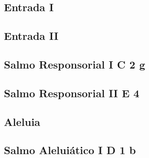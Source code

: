 \def\Prefix{communia/commune-martyrum}

\subsection{Entrada I}\label{subsection:communia/commune-martyrum/introitus-1}

\AllowPageFlush

\subsection{Entrada II}\label{subsection:communia/commune-martyrum/introitus-2}

\AllowPageFlush

\subsection[Salmo Responsorial I]{Salmo Responsorial I \textmd{C 2 g}}\label{subsection:communia/commune-martyrum/psalmus-responsorius-1}

\subsection[Salmo Responsorial II]{Salmo Responsorial II \textmd{E 4}}\label{subsection:communia/commune-martyrum/psalmus-responsorius-2}

\AllowPageFlush

\subsection{Aleluia}\label{subsection:communia/commune-martyrum/alleluia}

\AllowPageFlush

\subsection[Salmo Aleluiático I]{Salmo Aleluiático I \textmd{D 1 b}}\label{subsection:communia/commune-martyrum/psalmus-alleluiaticus-1}

\AllowPageFlush

